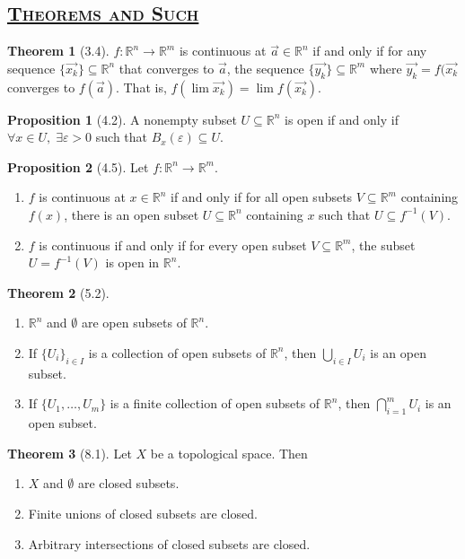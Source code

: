 \documentclass{article}
\newcommand{\R}{\ensuremath{\mathbb{R}}}
\newcommand{\Iff}{if and only if}
\newcommand{\ts}{topological space}
\newcommand{\es}{\ensuremath{\emptyset}}
\newcommand{\func}[3]{\ensuremath{#1: #2 \to #3}}
\newcommand{\ball}[3]{\ensuremath{B_{#1}^{#2}(#3)}}
\newcommand{\Union}{\bigcup}
\newcommand{\Inter}{\bigcap}
\renewcommand{\Subset}{\subseteq}
\theoremstyle{definition}
\newtheorem*{thm}{Theorem}
\newtheorem*{prop}{Proposition}
\theoremstyle{remark}
\begin{document}
    \subsection*{\underline{\textsc{Theorems and Such}}}{
        \begin{thm}[3.4]
            $\func{f}{\R^n}{\R^m}$ is continuous at $\Vec{a} \in \R^n$ \Iff{} for any sequence $\{\Vec{x_k}\} \Subset \R^n$ that converges to $\Vec{a}$, the sequence $\{\Vec{y_k}\} \Subset \R^m$ where $\Vec{y_k} = f(\Vec{x_k}$ converges to $f(\Vec{a})$. That is, $f(\lim \Vec{x_k}) = \lim f(\Vec{x_k})$.
        \end{thm}
    
        \begin{prop}[4.2]
            A nonempty subset $U \Subset \R^n$ is open \Iff{} $\forall x \in U, \; \exists \varepsilon>0$ such that $\ball{x}{}{\varepsilon} \Subset U$.
        \end{prop}
        
        \begin{prop}[4.5]
            Let $\func{f}{\R^n}{\R^m}$.
            \begin{enumerate}
                \item $f$ is continuous at $x \in \R^n$ \Iff{} for all open subsets $V \Subset \R^m$ containing $f(x)$, there is an open subset $U \Subset \R^n$ containing $x$ such that $U \Subset f^{-1}(V)$.
                \item $f$ is continuous \Iff{} for every open subset $V \Subset \R^m$, the subset $U=f^{-1}(V)$ is open in $\R^n$.
            \end{enumerate}
        \end{prop}
        
        \begin{thm}[5.2] \hfill
            \begin{enumerate}
                \item $\R^n$ and $\es$ are open subsets of $\R^n$.
                \item If $\{U_i\}_{i\in I}$ is a collection of open subsets of $\R^n$, then $\Union_{i\in I} U_i$ is an open subset.
                \item If $\{U_1,\ldots,U_m\}$ is a finite collection of open subsets of $\R^n$, then $\Inter\limits_{i=1}^m U_i$ is an open subset. 
            \end{enumerate}
        \end{thm}
        
        \begin{thm}[8.1] Let $X$ be a \ts{}. Then
        \begin{enumerate}
            \item $X$ and $\es$ are closed subsets.
            \item Finite unions of closed subsets are closed.
            \item Arbitrary intersections of closed subsets are closed.
        \end{enumerate}
        \end{thm}
        
}
\end{document}
